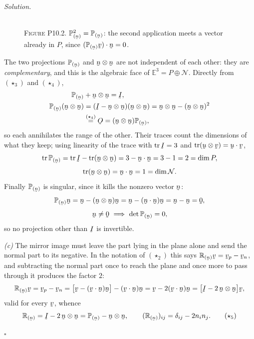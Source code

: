 \documentclass[17pt,a4paper]{extreport}
\DeclareRobustCommand{\vek}[1]{\underaccent{\tilde}{#1}}
\newcommand{\Et}{\mathbb{E}^{3}}
\newcommand{\Proj}[1]{\mathbb{P}_{(#1)}}
\newcommand{\Refl}[1]{\mathbb{R}_{(#1)}}
\newcommand{\tr}{\operatorname{tr}}
\newcommand{\I}{\vek{I}}
\newcommand{\Ob}{\vek{O}}
\newcommand{\bu}{\vek{u}}
\newcommand{\bv}{\vek{v}}
\newcommand{\bn}{\vek{n}}
\newcommand{\bze}{\vek{0}}
\newcommand{\dd}{\delta}
\newcommand{\ip}[2]{#1\cdot#2}
\theoremstyle{scplain}
\theoremstyle{scdefn}
\theoremstyle{scplain}
\newenvironment{solution}
 {\par\smallskip\noindent\textit{Solution.}\ }
 {\hfill$\square$\par\medskip}
\begin{document}
\begin{solution}
\begin{figure}[htbp]\centering
{}
\\[1.2ex]
{\footnotesize\textsc{Figure P10.2.} $\Proj{\bn}^{2}=\Proj{\bn}$: the second
application meets a vector already in $P$, since
$\ip{(\Proj{\bn}\bv)}{\bn}=0$.}
\end{figure}


The two projections $\Proj{\bn}$ and $\bn\otimes\bn$ are not independent of
each other: they are \emph{complementary}, and this is the algebraic face of
$\Et=P\oplus\mathcal{N}$. Directly from $(\star_3)$ and $(\star_4)$,
\[
\begin{aligned}
   \Proj{\bn}&+\bn\otimes\bn=\I,\\
   \Proj{\bn}(\bn\otimes\bn)&=(\I-\bn\otimes\bn)(\bn\otimes\bn)
   =\bn\otimes\bn-(\bn\otimes\bn)^{2}\\
   &\overset{(\star_4)}{=}\Ob=(\bn\otimes\bn)\Proj{\bn},
\end{aligned}
\]
so each annihilates the range of the other. Their traces count the
dimensions of what they keep; using linearity of the trace with $\tr\I=3$
and $\tr(\bu\otimes\bv)=\ip\bu\bv$,
\[
   \tr\Proj{\bn}=\tr\I-\tr(\bn\otimes\bn)=3-\ip\bn\bn=3-1=2=\dim P,
\]
\[
   \tr(\bn\otimes\bn)=\ip\bn\bn=1=\dim\mathcal{N}.
\]
Finally $\Proj{\bn}$ is singular, since it kills the nonzero vector $\bn$:
\[
   \Proj{\bn}\bn=\bn-(\bn\otimes\bn)\bn=\bn-(\ip\bn\bn)\bn=\bn-\bn=\bze,
\]
\[
   \bn\neq\bze
   \ \Longrightarrow\ \det\Proj{\bn}=0 ,
\]
so no projection other than $\I$ is invertible.

\emph{(c)} The mirror image must leave the part lying in the plane alone and
send the normal part to its negative. In the notation of $(\star_2)$ this
says $\Refl{\bn}\bv=\bv_p-\bv_n$, and subtracting the normal part once to
reach the plane and once more to pass through it produces the factor $2$:
\begin{equation}
   \Refl{\bn}\bv=\bv_p-\bv_n
   =\big[\bv-(\ip\bv\bn)\bn\big]-(\ip\bv\bn)\bn
   =\bv-2(\ip\bv\bn)\bn
   =\big[\I-2\,\bn\otimes\bn\big]\bv,
\end{equation}
valid for every $\bv$, whence
\begin{equation}
   \Refl{\bn}=\I-2\,\bn\otimes\bn=\Proj{\bn}-\bn\otimes\bn,\qquad
   (\Refl{\bn})_{ij}=\dd_{ij}-2n_in_j . \tag{$\star_5$}
\end{equation}



\end{solution}
\end{document}
